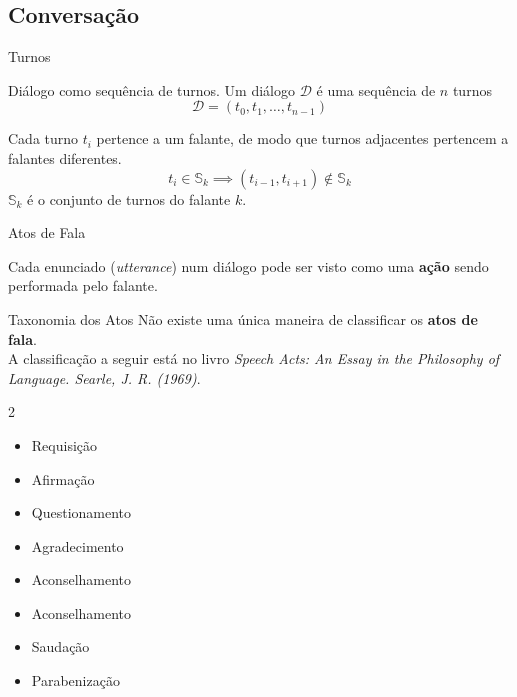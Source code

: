 \subsection{Conversação}
\begin{frame}{Turnos}
  \begin{block}{Diálogo como sequência de turnos.}
    Um diálogo $\mathcal{D}$ é uma sequência de $n$ turnos \cite{lang_processing_book}
    \[
      \mathcal{D} = (t_0, t_1, \dots, t_{n-1})
    \]
  \end{block}
  \begin{block}{}
    Cada turno $t_i$ pertence a um falante, de modo que turnos adjacentes pertencem a
    falantes diferentes.
    \[
      t_i \in \mathbb{S}_k \implies (t_{i-1}, t_{i+1}) \notin \mathbb{S}_k
    \]
    \(\mathbb{S}_k\) é o conjunto de turnos do falante \(k\).
  \end{block}
\end{frame}

\begin{frame}{Atos de Fala}
  \begin{block}{}
    Cada enunciado (\textit{utterance}) num diálogo pode ser visto como uma \textbf{ação}
    sendo performada pelo falante.
  \end{block}
  \begin{block}{Taxonomia dos Atos}
    Não existe uma única maneira de classificar os \textbf{atos de fala}. \\
    A classificação a seguir está no livro \textit{Speech Acts: An Essay in the
    Philosophy of Language. Searle, J. R. (1969)}\cite{SpeechActs_Searle1969_book}.
    \begin{multicols}{2}
      \begin{itemize}
        \item Requisição
        \item Afirmação
        \item Questionamento
        \item Agradecimento
        \item Aconselhamento
        \item Aconselhamento
        \item Saudação
        \item Parabenização
      \end{itemize}
    \end{multicols}
  \end{block}
\end{frame}

